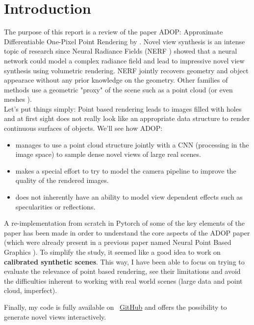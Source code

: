 \section{Introduction}
\label{sec:intro}
The purpose of this report is a review of the paper ADOP: Approximate Differentiable One-Pixel Point Rendering by \citet{ruckert2022adop}.
Novel view synthesis is an intense topic of research since Neural Radiance Fields (NERF \cite{mildenhall2020nerf}) showed that a neural network could model a complex radiance field and lead to impressive novel view synthesis using volumetric rendering. NERF jointly recovers geometry and object appearace without any prior knowledge on the geometry. 
Other families of methods use a geometric "proxy" of the scene such as a point cloud \cite{Aliev2020} (or even meshes \cite{worchel2022nds}). \\
Let's put things simply: Point based rendering leads to images filled with holes and at first sight does not really look like an appropriate data structure to render continuous surfaces of objects.
We'll see how ADOP:
\begin{itemize}
    \item manages to use a point cloud structure jointly with a CNN (processing in the image space) to sample dense novel views of large real scenes.
    \item makes a special effort to try to model the camera pipeline to improve the quality of the rendered images.
    \item does not inherently have an ability to model view dependent effects such as specularities or reflections.
\end{itemize}

A re-implementation from scratch in Pytorch of some of the key elements of the paper has been made in order to understand the core aspects of the ADOP paper (which were already present in a previous paper named Neural Point Based Graphics \cite{Aliev2020}). To simplify the study, it seemed like a good idea to work on \textbf{calibrated synthetic scenes}. This way, I have been able to focus on trying to evaluate the relevance of point based rendering, see their limitations and avoid the difficulties inherent to working with real world scenes (large data and point cloud, imperfect).

\noindent Finally, my code is fully available on ~\href{https://github.com/balthazarneveu/per-pixel-point-rendering}{GitHub} and offers the possibility to generate novel views interactively.
